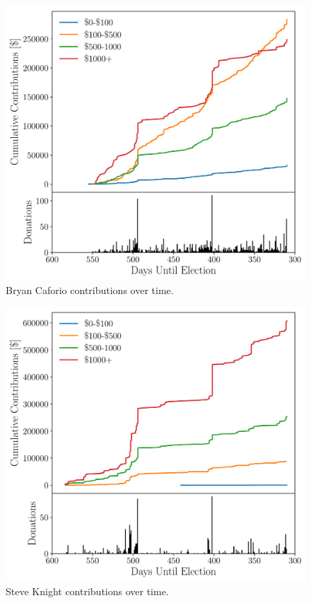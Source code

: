 \documentclass[10pt]{article}
\begin{document}
\begin{figure}
\begin{minipage}[b]{0.45\linewidth}
\includegraphics[width=\textwidth, center]{Caforio_Totals_overTime.pdf}
\caption{Bryan Caforio contributions over time.}
\end{minipage}
\end{figure}

\begin{figure}[ht]
\includegraphics[width=0.5\linewidth, center]{Knight_Totals_overTime.pdf}
\caption{Steve Knight contributions over time.}

\end{figure}



\end{document}
